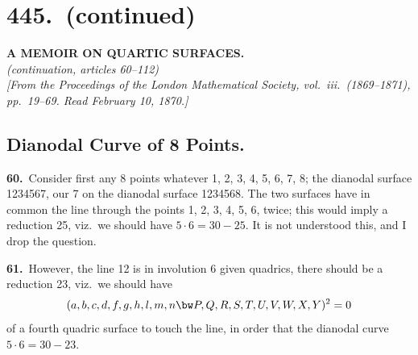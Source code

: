 \documentclass[11pt,a4paper]{article}
\begin{document}
\setcounter{page}{150}

\setcounter{page}{154}

\section*{445.\ (continued)}
\begin{center}
\Large\textbf{A MEMOIR ON QUARTIC SURFACES.}\\[0.3em]
\normalsize\textit{(continuation, articles 60--112)}\\[0.3em]
\small\textit{[From the Proceedings of the London Mathematical Society, vol.\ iii.\ (1869--1871), pp.\ 19--69. Read February 10, 1870.]}
\end{center}

\setcounter{section}{59}

\medskip

\newpage
\setcounter{page}{155}

\subsection*{Dianodal Curve of 8 Points.}

\noindent\textbf{60.}\ Consider first any 8 points whatever 1, 2, 3, 4, 5, 6, 7, 8; the dianodal surface 1234567, our 7 on the dianodal surface 1234568. The two surfaces have in common the line through the points 1, 2, 3, 4, 5, 6, twice; this would imply a reduction 25, viz.\ we should have $5 \cdot 6 = 30 - 25$. It is not understood this, and I drop the question.

\medskip

\textbf{61.}\ However, the line 12 is in involution 6 given quadrics, there should be a reduction 23, viz.\ we should have
\[
(a, b, c, d, f, g, h, l, m, n \bw P, Q, R, S, T, U, V, W, X, Y)^2 = 0
\]
of a fourth quadric surface to touch the line, in order that the dianodal curve $5 \cdot 6 = 30 - 23$.
\end{document}
